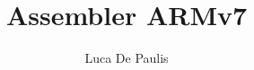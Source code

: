 \documentclass[italian,oneside,headinclude,10pt]{scrartcl}
\begin{document}
\author{Luca De Paulis}
\title{Assembler ARMv7}
\maketitle






\end{document}
